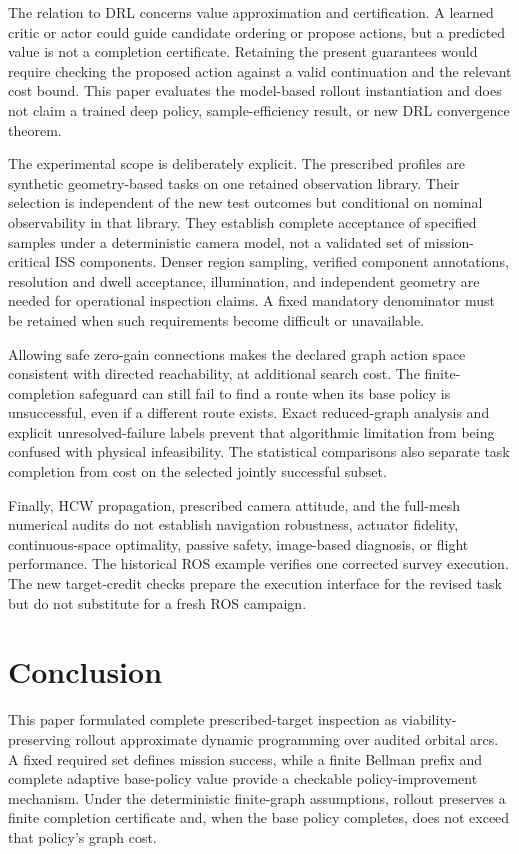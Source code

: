 The relation to DRL concerns value approximation and certification. A learned critic or actor could guide candidate ordering or propose actions, but a predicted value is not a completion certificate. Retaining the present guarantees would require checking the proposed action against a valid continuation and the relevant cost bound. This paper evaluates the model-based rollout instantiation and does not claim a trained deep policy, sample-efficiency result, or new DRL convergence theorem.

The experimental scope is deliberately explicit. The prescribed profiles are synthetic geometry-based tasks on one retained observation library. Their selection is independent of the new test outcomes but conditional on nominal observability in that library. They establish complete acceptance of specified samples under a deterministic camera model, not a validated set of mission-critical ISS components. Denser region sampling, verified component annotations, resolution and dwell acceptance, illumination, and independent geometry are needed for operational inspection claims. A fixed mandatory denominator must be retained when such requirements become difficult or unavailable.

Allowing safe zero-gain connections makes the declared graph action space consistent with directed reachability, at additional search cost. The finite-completion safeguard can still fail to find a route when its base policy is unsuccessful, even if a different route exists. Exact reduced-graph analysis and explicit unresolved-failure labels prevent that algorithmic limitation from being confused with physical infeasibility. The statistical comparisons also separate task completion from cost on the selected jointly successful subset.

Finally, HCW propagation, prescribed camera attitude, and the full-mesh numerical audits do not establish navigation robustness, actuator fidelity, continuous-space optimality, passive safety, image-based diagnosis, or flight performance. The historical ROS example verifies one corrected survey execution. The new target-credit checks prepare the execution interface for the revised task but do not substitute for a fresh ROS campaign.

\section{Conclusion}
\label{sec:conclusion}

This paper formulated complete prescribed-target inspection as viability-preserving rollout approximate dynamic programming over audited orbital arcs. A fixed required set defines mission success, while a finite Bellman prefix and complete adaptive base-policy value provide a checkable policy-improvement mechanism. Under the deterministic finite-graph assumptions, rollout preserves a finite completion certificate and, when the base policy completes, does not exceed that policy's graph cost.

